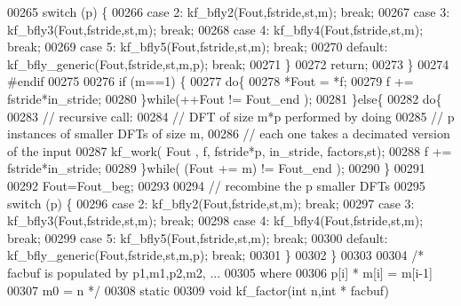 \begin{DoxyCode}
00265         \textcolor{keywordflow}{switch} (p) \{
00266             \textcolor{keywordflow}{case} 2: kf_bfly2(Fout,fstride,st,m); \textcolor{keywordflow}{break};
00267             \textcolor{keywordflow}{case} 3: kf_bfly3(Fout,fstride,st,m); \textcolor{keywordflow}{break}; 
00268             \textcolor{keywordflow}{case} 4: kf_bfly4(Fout,fstride,st,m); \textcolor{keywordflow}{break};
00269             \textcolor{keywordflow}{case} 5: kf_bfly5(Fout,fstride,st,m); \textcolor{keywordflow}{break}; 
00270             \textcolor{keywordflow}{default}: kf_bfly_generic(Fout,fstride,st,m,p); \textcolor{keywordflow}{break};
00271         \}
00272         \textcolor{keywordflow}{return};
00273     \}
00274 \textcolor{preprocessor}{#endif}
00275 
00276     \textcolor{keywordflow}{if} (m==1) \{
00277         \textcolor{keywordflow}{do}\{
00278             *Fout = *f;
00279             f += fstride*in\_stride;
00280         \}\textcolor{keywordflow}{while}(++Fout != Fout\_end );
00281     \}\textcolor{keywordflow}{else}\{
00282         \textcolor{keywordflow}{do}\{
00283             \textcolor{comment}{// recursive call:}
00284             \textcolor{comment}{// DFT of size m*p performed by doing}
00285             \textcolor{comment}{// p instances of smaller DFTs of size m, }
00286             \textcolor{comment}{// each one takes a decimated version of the input}
00287             kf_work( Fout , f, fstride*p, in\_stride, factors,st);
00288             f += fstride*in\_stride;
00289         \}\textcolor{keywordflow}{while}( (Fout += m) != Fout\_end );
00290     \}
00291 
00292     Fout=Fout\_beg;
00293 
00294     \textcolor{comment}{// recombine the p smaller DFTs }
00295     \textcolor{keywordflow}{switch} (p) \{
00296         \textcolor{keywordflow}{case} 2: kf_bfly2(Fout,fstride,st,m); \textcolor{keywordflow}{break};
00297         \textcolor{keywordflow}{case} 3: kf_bfly3(Fout,fstride,st,m); \textcolor{keywordflow}{break}; 
00298         \textcolor{keywordflow}{case} 4: kf_bfly4(Fout,fstride,st,m); \textcolor{keywordflow}{break};
00299         \textcolor{keywordflow}{case} 5: kf_bfly5(Fout,fstride,st,m); \textcolor{keywordflow}{break}; 
00300         \textcolor{keywordflow}{default}: kf_bfly_generic(Fout,fstride,st,m,p); \textcolor{keywordflow}{break};
00301     \}
00302 \}
00303 
00304 \textcolor{comment}{/*  facbuf is populated by p1,m1,p2,m2, ...}
00305 \textcolor{comment}{    where }
00306 \textcolor{comment}{    p[i] * m[i] = m[i-1]}
00307 \textcolor{comment}{    m0 = n                  */}
00308 \textcolor{keyword}{static} 
00309 \textcolor{keywordtype}{void} kf_factor(\textcolor{keywordtype}{int} n,\textcolor{keywordtype}{int} * facbuf)

\end{DoxyCode}
